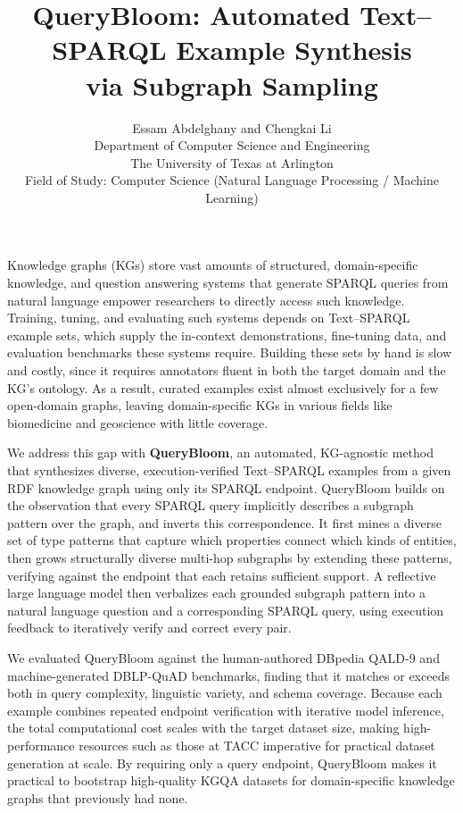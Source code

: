 \documentclass[11pt]{article}
\title{\vspace{-1em}QueryBloom: Automated Text--SPARQL Example Synthesis\\ via Subgraph Sampling}
\author{
  Essam Abdelghany and Chengkai Li \\[0.3em]
  \normalsize Department of Computer Science and Engineering \\
  \normalsize The University of Texas at Arlington \\
  \normalsize Field of Study: Computer Science (Natural Language Processing / Machine Learning)
}
\date{}
\begin{document}
\maketitle
\vspace{-2.5em}

Knowledge graphs (KGs) store vast amounts of structured, domain-specific knowledge, and question answering systems that generate SPARQL queries from natural language empower researchers to directly access such knowledge. Training, tuning, and
evaluating such systems depends on Text--SPARQL example sets, which supply the
in-context demonstrations, fine-tuning data, and evaluation benchmarks these systems
require. Building these sets by hand is
slow and costly, since it requires annotators fluent in both the target domain and the
KG's ontology. As a result, curated examples exist almost exclusively for a few
open-domain graphs, leaving domain-specific KGs in various fields like biomedicine and
geoscience with little coverage.

We address this gap with \textbf{QueryBloom}, an automated, KG-agnostic method that
synthesizes diverse, execution-verified Text--SPARQL examples from a given RDF knowledge
graph using only its SPARQL endpoint. QueryBloom builds on the observation that every
SPARQL query implicitly describes a subgraph pattern over the graph, and inverts this
correspondence. It first mines a diverse set of type patterns that capture which properties connect which kinds of entities, then grows structurally diverse multi-hop subgraphs by extending these patterns, verifying against the endpoint that each retains sufficient support. A reflective
large language model then verbalizes each grounded subgraph pattern into a natural language
question and a corresponding SPARQL query, using execution feedback to iteratively
verify and correct every pair.


We evaluated QueryBloom against the human-authored DBpedia QALD-9 and
machine-generated DBLP-QuAD benchmarks, finding that it matches or exceeds both in
query complexity, linguistic variety, and schema coverage. Because each example
combines repeated endpoint verification with iterative model inference, the total computational
cost scales with the target dataset size, making high-performance resources such as those at TACC imperative for practical dataset generation at scale. By requiring only a query endpoint, QueryBloom makes it practical to
bootstrap high-quality KGQA datasets for domain-specific knowledge graphs that
previously had none.
\end{document}
